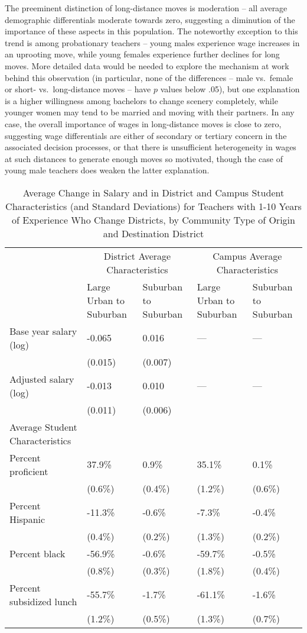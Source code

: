 \documentclass[12pt,]{article}
\begin{document}
The preeminent distinction of long-distance moves is moderation -- all
average demographic differentials moderate towards zero, suggesting a
diminution of the importance of these aspects in this population. The
noteworthy exception to this trend is among probationary teachers --
young males experience wage increases in an uprooting move, while young
females experience further declines for long moves. More detailed data
would be needed to explore the mechanism at work behind this observation
(in particular, none of the differences -- male vs.~female or short-
vs.~long-distance moves -- have \(p\) values below .05), but one
explanation is a higher willingness among bachelors to change scenery
completely, while younger women may tend to be married and moving with
their partners. In any case, the overall importance of wages in
long-distance moves is close to zero, suggesting wage differentials are
either of secondary or tertiary concern in the associated decision
processes, or that there is unsufficient heterogeneity in wages at such
distances to generate enough moves so motivated, though the case of
young male teachers does weaken the latter explanation.

\begin{table}[htbp]
\centering
\begin{tabular}{lp{}p{}p{}p{}}
  \hline
 & \multicolumn{2}{c}{District Average Characteristics} & \multicolumn{2}{c}{Campus Average Characteristics}\\ \cline{2-5}
 & Large Urban to Suburban & Suburban to Suburban & Large Urban to Suburban & Suburban to Suburban \\
  \hline
Base year salary (log) & -0.065 & 0.016 & --- & --- \\ 
   & (0.015) & (0.007) &  &  \\ 
  Adjusted salary (log) & -0.013 & 0.010 & --- & --- \\ 
   & (0.011) & (0.006) &  &  \\ 
Average Student Characteristics & & & & \\
  \quad Percent proficient & 37.9\% & 0.9\% & 35.1\% & 0.1\% \\ 
   & (0.6\%) & (0.4\%) & (1.2\%) & (0.6\%) \\ 
  \quad Percent Hispanic & -11.3\% & -0.6\% & -7.3\% & -0.4\% \\ 
   & (0.4\%) & (0.2\%) & (1.3\%) & (0.2\%) \\ 
  \quad Percent black & -56.9\% & -0.6\% & -59.7\% & -0.5\% \\ 
   & (0.8\%) & (0.3\%) & (1.8\%) & (0.4\%) \\ 
  \quad Percent subsidized lunch & -55.7\% & -1.7\% & -61.1\% & -1.6\% \\ 
   & (1.2\%) & (0.5\%) & (1.3\%) & (0.7\%) \\ 
   \hline
\end{tabular}
\caption{Average Change in Salary and in District and Campus Student Characteristics (and Standard Deviations) for Teachers with 1-10 Years of Experience Who Change Districts, by Community Type of Origin and Destination District} 
\label{tbl:change_by_urb}
\end{table}
\end{document}
